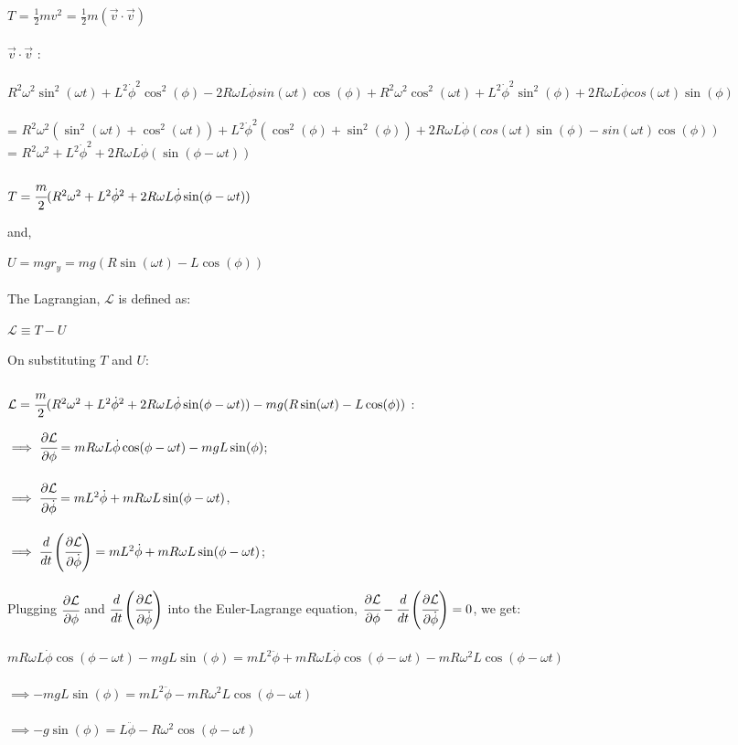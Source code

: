 \documentclass[11pt]{article}
\newcommand{\Lagr}{\mathcal{L}}
\begin{document}
\begin{enumerate}
$T$ = $\frac{1}{2}mv^2$ = $\frac{1}{2} m (\vec{v} \cdot \vec{v})$
\\ \\
$\vec{v} \cdot \vec{v}$ :
\\ \\
$R^2 \omega^2 \sin^2(\omega t) + L^2 \dot{\phi}^2 \cos^2(\phi) - 2 R \omega L \dot{\phi} sin(\omega t) \cos(\phi) + R^2 \omega^2 \cos^2(\omega t) + L^2 \dot{\phi}^2 \sin^2(\phi) + 2 R \omega L \dot{\phi} cos(\omega t) \sin(\phi)$
\\ \\
= $R^2 \omega^2 (\sin^2(\omega t)+\cos^2(\omega t)) + L^2 \dot{\phi}^2 (\cos^2(\phi)+\sin^2(\phi)) + 2 R \omega L \dot{\phi}(cos(\omega t) \sin(\phi) - sin(\omega t) \cos(\phi))$
\\ 
= $R^2 \omega^2 + L^2 \dot{\phi}^2 + 2 R \omega L \dot{\phi}(\sin(\phi - \omega t))$
\\ \\
$T = \cfrac{m}{2} (R^2 \omega^2 + L^2 \dot{\phi}^2 + 2 R \omega L \dot{\phi}\sin(\phi - \omega t))$

and,

$U = mg{r_y} = mg(R \sin(\omega t) - L \cos(\phi))$
\\ \\
The Lagrangian, $\Lagr$ is defined as:
\begin{center}
  $\Lagr \equiv  T - U$
\end{center}
On substituting $T$ and $U$:
\\ \\
$\Lagr = \cfrac{m}{2} (R^2 \omega^2 + L^2 \dot{\phi}^2 + 2 R \omega L \dot{\phi}\sin(\phi - \omega t)) - mg(R \sin(\omega t) - L \cos(\phi))$ :

$\implies \cfrac{\partial \Lagr}{\partial \phi} = m R \omega L \dot{\phi} \cos(\phi - \omega t) - m g L \sin(\phi)$;
\\ \\
$\implies \cfrac{\partial \Lagr}{\partial \dot{\phi}} = m L^2 \dot{\phi} + m R \omega L \sin(\phi - \omega t)$,
\\ \\
$\implies \cfrac{d}{dt} \left( \cfrac{\partial \Lagr}{\partial \dot{\phi}} \right) = m L^2 \dot{\phi} + m R \omega L \sin(\phi - \omega t)$;
\\ \\ 
Plugging $\cfrac{\partial \Lagr}{\partial \phi}$ and $\cfrac{d}{dt} \left( \cfrac{\partial \Lagr}{\partial \dot{\phi}} \right)$ into the Euler-Lagrange equation, $\cfrac{\partial \Lagr}{\partial \phi} - \cfrac{d}{dt} \left( \cfrac{\partial \Lagr}{\partial \dot{\phi}} \right) = 0$, we get:
\\ \\
$m R \omega L \dot{\phi} \cos(\phi - \omega t) - m g L \sin(\phi) = m L^2 \ddot{\phi} + m R \omega L \dot{\phi} \cos(\phi - \omega t) - m R \omega^2 L \cos(\phi - \omega t)$
\\ \\
$\implies - m g L \sin(\phi) = m L^2 \ddot{\phi} - m R \omega^2 L \cos(\phi - \omega t)$
\\ \\
$\implies - g \sin(\phi) = L \ddot{\phi} - R \omega^2 \cos(\phi - \omega t)$


\end{enumerate}
\end{document}
